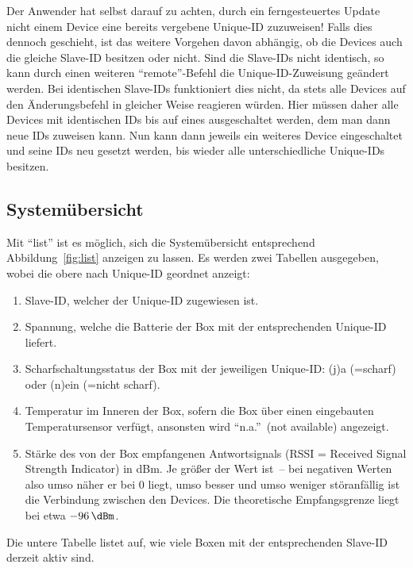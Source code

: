 \documentclass[paper=a4, parskip, numbers=noenddot, toc=listof, headsepline]{scrbook}
\begin{document}
					Der Anwender hat selbst darauf zu achten, durch ein ferngesteuertes Update nicht einem Device eine bereits vergebene Unique-ID zuzuweisen! Falls dies dennoch geschieht, ist das weitere Vorgehen davon abhängig, ob die Devices auch die gleiche Slave-ID besitzen oder nicht. Sind die Slave-IDs nicht identisch, so kann durch einen weiteren \enquote{remote}-Befehl die Unique-ID-Zuweisung geändert werden. Bei identischen Slave-IDs funktioniert dies nicht, da stets alle Devices auf den Änderungsbefehl in gleicher Weise reagieren würden. Hier müssen daher alle Devices mit identischen IDs bis auf eines ausgeschaltet werden, dem man dann neue IDs zuweisen kann. Nun kann dann jeweils ein weiteres Device eingeschaltet und seine IDs neu gesetzt werden, bis wieder alle unterschiedliche Unique-IDs besitzen.

			\subsection{Systemübersicht}
				\label{sec:list}

				Mit \enquote{list} ist es möglich, sich die Systemübersicht entsprechend Abbildung~\ref{fig:list} anzeigen zu lassen. Es werden zwei Tabellen ausgegeben, wobei die obere nach Unique-ID geordnet anzeigt:
				\begin{enumerate}
					\item
					      Slave-ID, welcher der Unique-ID zugewiesen ist.
					\item
					      Spannung, welche die Batterie der Box mit der entsprechenden Unique-ID liefert.
					\item
					      Scharfschaltungsstatus der Box mit der jeweiligen Unique-ID: (j)a (=scharf) oder (n)ein (=nicht scharf).
					\item
					      Temperatur im Inneren der Box, sofern die Box über einen eingebauten Temperatursensor verfügt, ansonsten wird \enquote{n.a.}~(not available) angezeigt.
					\item
					      Stärke des von der Box empfangenen Antwortsignals (RSSI = Received Signal Strength Indicator) in dBm. Je größer der Wert ist~-- bei negativen Werten also umso näher er bei 0 liegt, umso besser und umso weniger störanfällig ist die Verbindung zwischen den Devices. Die theoretische Empfangsgrenze liegt bei etwa $\SI{-96}{\dBm}$.
				\end{enumerate}

				Die untere Tabelle listet auf, wie viele Boxen mit der entsprechenden Slave-ID derzeit aktiv sind.
\end{document}
